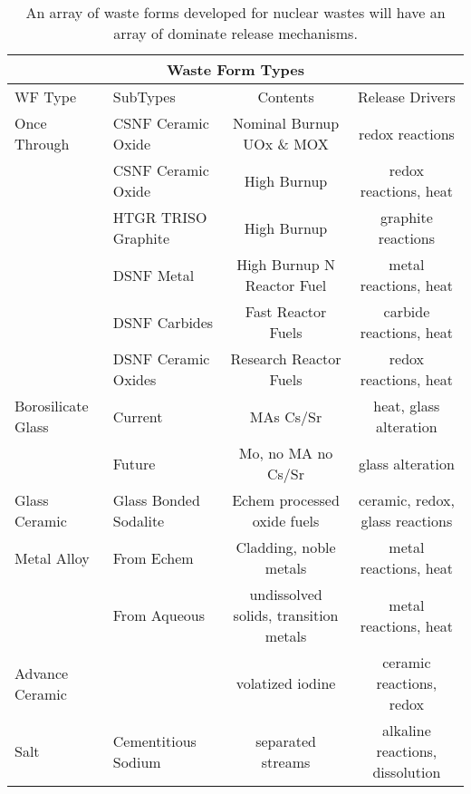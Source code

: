 %
\begin{table}[h!]
  \centering
  \footnotesize{
  \begin{tabular}{|l|l|c|c|}
    \multicolumn{4}{c}{\textbf{Waste Form Types}}\\
    \hline
    WF Type & SubTypes & Contents & Release Drivers  \\
    \hline
    \hline
    Once Through & \gls{CSNF} Ceramic Oxide & Nominal Burnup UOx \& MOX & redox reactions \\
                 & \gls{CSNF} Ceramic Oxide & High Burnup  & redox reactions, heat  \\
                 & \gls{HTGR} TRISO Graphite & High Burnup & graphite reactions\\
                 & \gls{DSNF} Metal  & High Burnup N Reactor Fuel & metal reactions,  heat\\
                 & \gls{DSNF} Carbides  & Fast Reactor Fuels & carbide reactions,  heat\\
                 & \gls{DSNF} Ceramic Oxides  & Research Reactor Fuels & redox reactions,  heat\\
    \hline
    Borosilicate Glass & Current & \glspl{MA} Cs/Sr & heat, glass alteration \\
                       & Future & Mo, no \gls{MA} no Cs/Sr & glass alteration  \\
    \hline
    Glass Ceramic & Glass Bonded Sodalite & Echem processed oxide fuels & ceramic, redox, glass reactions  \\
    \hline
    Metal Alloy & From Echem & Cladding, noble metals & metal reactions, heat \\
                & From Aqueous & undissolved solids, transition metals & metal reactions, heat  \\
    \hline
    Advance Ceramic &  & volatized iodine  & ceramic reactions, redox \\
    \hline
    Salt  & Cementitious Sodium  & separated streams  & alkaline reactions, dissolution \\
    \hline
  \end{tabular}
  \caption[Waste Form Types]{An array of waste forms developed for nuclear 
  wastes will have an array of dominate release 
  mechanisms.\cite{blink_disposal_2010}}
  \label{tab:wf}
  }
\end{table}



